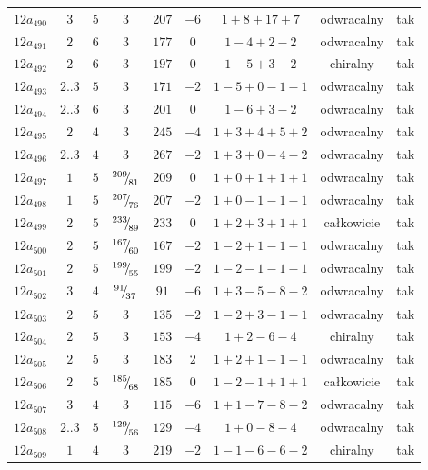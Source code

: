 \begin{longtable}{ccccccccc}
$12a_{490}$ & $3$ & $5$ & $3$ & $207$ & $-6$ & $1+8+17+7$ & odwracalny & tak \\
$12a_{491}$ & $2$ & $6$ & $3$ & $177$ & $0$ & $1-4+2-2$ & odwracalny & tak \\
$12a_{492}$ & $2$ & $6$ & $3$ & $197$ & $0$ & $1-5+3-2$ & chiralny & tak \\
$12a_{493}$ & $2..3$ & $5$ & $3$ & $171$ & $-2$ & $1-5+0-1-1$ & odwracalny & tak \\
$12a_{494}$ & $2..3$ & $6$ & $3$ & $201$ & $0$ & $1-6+3-2$ & odwracalny & tak \\
$12a_{495}$ & $2$ & $4$ & $3$ & $245$ & $-4$ & $1+3+4+5+2$ & odwracalny & tak \\
$12a_{496}$ & $2..3$ & $4$ & $3$ & $267$ & $-2$ & $1+3+0-4-2$ & odwracalny & tak \\
$12a_{497}$ & $1$ & $5$ & ${}^{209}{\mskip -5mu/\mskip -3mu}_{81}$ & $209$ & $0$ & $1+0+1+1+1$ & odwracalny & tak \\
$12a_{498}$ & $1$ & $5$ & ${}^{207}{\mskip -5mu/\mskip -3mu}_{76}$ & $207$ & $-2$ & $1+0-1-1-1$ & odwracalny & tak \\
$12a_{499}$ & $2$ & $5$ & ${}^{233}{\mskip -5mu/\mskip -3mu}_{89}$ & $233$ & $0$ & $1+2+3+1+1$ & całkowicie & tak \\
$12a_{500}$ & $2$ & $5$ & ${}^{167}{\mskip -5mu/\mskip -3mu}_{60}$ & $167$ & $-2$ & $1-2+1-1-1$ & odwracalny & tak \\
$12a_{501}$ & $2$ & $5$ & ${}^{199}{\mskip -5mu/\mskip -3mu}_{55}$ & $199$ & $-2$ & $1-2-1-1-1$ & odwracalny & tak \\
$12a_{502}$ & $3$ & $4$ & ${}^{91}{\mskip -5mu/\mskip -3mu}_{37}$ & $91$ & $-6$ & $1+3-5-8-2$ & odwracalny & tak \\
$12a_{503}$ & $2$ & $5$ & $3$ & $135$ & $-2$ & $1-2+3-1-1$ & odwracalny & tak \\
$12a_{504}$ & $2$ & $5$ & $3$ & $153$ & $-4$ & $1+2-6-4$ & chiralny & tak \\
$12a_{505}$ & $2$ & $5$ & $3$ & $183$ & $2$ & $1+2+1-1-1$ & odwracalny & tak \\
$12a_{506}$ & $2$ & $5$ & ${}^{185}{\mskip -5mu/\mskip -3mu}_{68}$ & $185$ & $0$ & $1-2-1+1+1$ & całkowicie & tak \\
$12a_{507}$ & $3$ & $4$ & $3$ & $115$ & $-6$ & $1+1-7-8-2$ & odwracalny & tak \\
$12a_{508}$ & $2..3$ & $5$ & ${}^{129}{\mskip -5mu/\mskip -3mu}_{56}$ & $129$ & $-4$ & $1+0-8-4$ & odwracalny & tak \\
$12a_{509}$ & $1$ & $4$ & $3$ & $219$ & $-2$ & $1-1-6-6-2$ & chiralny & tak \\

\end{longtable}
